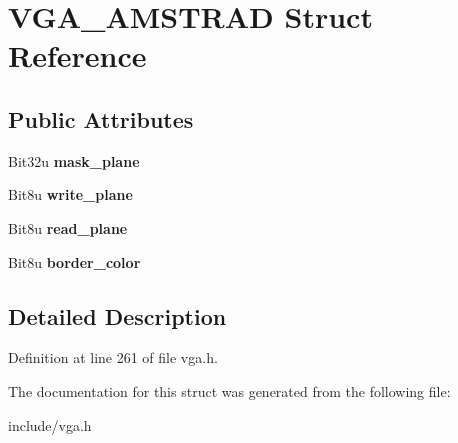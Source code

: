 \hypertarget{structVGA__AMSTRAD}{\section{V\-G\-A\-\_\-\-A\-M\-S\-T\-R\-A\-D Struct Reference}
\label{structVGA__AMSTRAD}
}
\subsection*{Public Attributes}
\begin{DoxyCompactItemize}
\item 
\hypertarget{structVGA__AMSTRAD_a3579c14ec7babb41e253a8310b9a71ed}{Bit32u {\bfseries mask\-\_\-plane}}\label{structVGA__AMSTRAD_a3579c14ec7babb41e253a8310b9a71ed}

\item 
\hypertarget{structVGA__AMSTRAD_a175865e5ad51119933b86b1a81f071dc}{Bit8u {\bfseries write\-\_\-plane}}\label{structVGA__AMSTRAD_a175865e5ad51119933b86b1a81f071dc}

\item 
\hypertarget{structVGA__AMSTRAD_adb93b9bfc436df9b90f1a7bc9d1dcfbe}{Bit8u {\bfseries read\-\_\-plane}}\label{structVGA__AMSTRAD_adb93b9bfc436df9b90f1a7bc9d1dcfbe}

\item 
\hypertarget{structVGA__AMSTRAD_ac7630605b97b058a383b751285e5de6e}{Bit8u {\bfseries border\-\_\-color}}\label{structVGA__AMSTRAD_ac7630605b97b058a383b751285e5de6e}

\end{DoxyCompactItemize}


\subsection{Detailed Description}


Definition at line 261 of file vga.\-h.



The documentation for this struct was generated from the following file\-:\begin{DoxyCompactItemize}
\item 
include/vga.\-h\end{DoxyCompactItemize}
